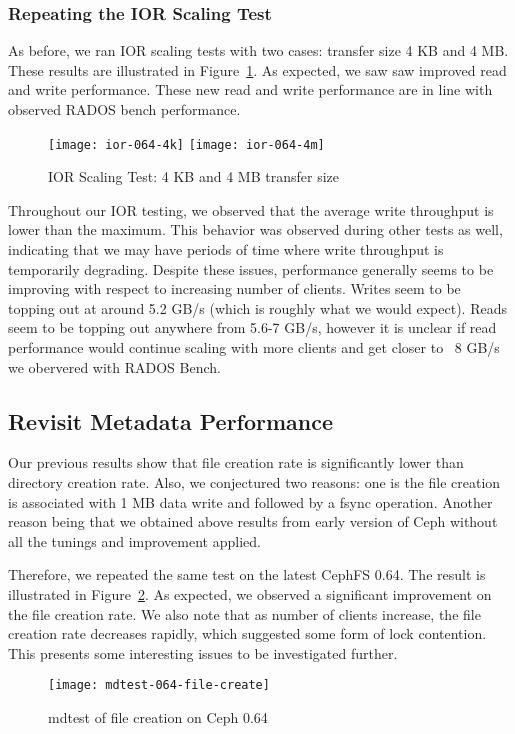 \subsubsection{Repeating the IOR Scaling Test}

As before, we ran IOR scaling tests with two cases: transfer size 4 KB and 4 MB.
These results are illustrated in Figure~\ref{fig:ior-064}. As expected, we saw
saw  improved read and write performance. These new read and write performance are in
line with observed RADOS bench performance.


\begin{figure}[htb]
\centering
\texttt{[image: ior-064-4k]}
\texttt{[image: ior-064-4m]}
\caption{IOR Scaling Test: 4 KB and 4 MB transfer size}
\label{fig:ior-064}
\end{figure}

Throughout our IOR testing, we observed that the average write throughput is 
lower than the maximum.  This behavior was observed during other tests as well,
indicating that we may have periods of time where write throughput is
temporarily degrading.  Despite these issues, performance generally seems to be
improving with respect to increasing number of clients.  Writes seem to be topping out at
around 5.2 GB/s (which is roughly what we would expect).  Reads seem to be
topping out anywhere from 5.6-7 GB/s, however it is unclear if read performance
would continue scaling with more clients and get closer to ~8 GB/s  we
obervered with RADOS Bench.

\subsection{Revisit Metadata Performance}

Our previous results show that file creation rate is significantly lower than
directory creation rate. Also, we conjectured two reasons: one is the file
creation is associated with 1 MB data write and followed by a fsync operation.
Another reason being that we obtained above results from early version of Ceph
without all the tunings and improvement applied. 

Therefore, we repeated the same test on the latest CephFS 0.64. The result is
illustrated in Figure~\ref{fig:mdtest-064-file-create}. As expected, we
observed a significant improvement on the file creation rate. We also note
that as number of clients increase, the file creation rate decreases rapidly,
which suggested some form of lock contention. This presents some interesting
issues to be investigated further.

\begin{figure}[htb]
\centering
\texttt{[image: mdtest-064-file-create]}
\caption{mdtest of file creation on Ceph 0.64}
\label{fig:mdtest-064-file-create}
\end{figure}

